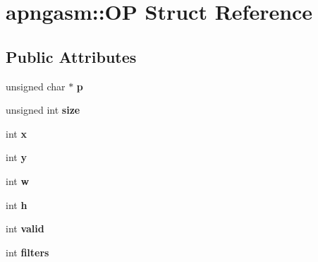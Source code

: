 \hypertarget{structapngasm_1_1OP}{\section{apngasm\-:\-:O\-P Struct Reference}
\label{structapngasm_1_1OP}
}
\subsection*{Public Attributes}
\begin{DoxyCompactItemize}
\item 
\hypertarget{structapngasm_1_1OP_acf200a8abaf2051c975218f4546c48a9}{unsigned char $\ast$ {\bfseries p}}\label{structapngasm_1_1OP_acf200a8abaf2051c975218f4546c48a9}

\item 
\hypertarget{structapngasm_1_1OP_a59c2e55283fa775453b231bb598e63bd}{unsigned int {\bfseries size}}\label{structapngasm_1_1OP_a59c2e55283fa775453b231bb598e63bd}

\item 
\hypertarget{structapngasm_1_1OP_a7e8fde9f50ec0626377ca17bcd3f0fad}{int {\bfseries x}}\label{structapngasm_1_1OP_a7e8fde9f50ec0626377ca17bcd3f0fad}

\item 
\hypertarget{structapngasm_1_1OP_a8a0b6f007b8f0443755aa27b6d0aa650}{int {\bfseries y}}\label{structapngasm_1_1OP_a8a0b6f007b8f0443755aa27b6d0aa650}

\item 
\hypertarget{structapngasm_1_1OP_a183c3f6e743197f522e212aa78352a99}{int {\bfseries w}}\label{structapngasm_1_1OP_a183c3f6e743197f522e212aa78352a99}

\item 
\hypertarget{structapngasm_1_1OP_a12524c9da7383e6b3234961a786078b0}{int {\bfseries h}}\label{structapngasm_1_1OP_a12524c9da7383e6b3234961a786078b0}

\item 
\hypertarget{structapngasm_1_1OP_a0e3c504d2726a90291411c534747ec87}{int {\bfseries valid}}\label{structapngasm_1_1OP_a0e3c504d2726a90291411c534747ec87}

\item 
\hypertarget{structapngasm_1_1OP_af95f39d9a456cf0b58036de43f002f72}{int {\bfseries filters}}\label{structapngasm_1_1OP_af95f39d9a456cf0b58036de43f002f72}

\end{DoxyCompactItemize}
